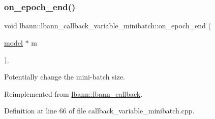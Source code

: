 \subsubsection{\texorpdfstring{on\+\_\+epoch\+\_\+end()}{on\_epoch\_end()}}
{\footnotesize\ttfamily void lbann\+::lbann\+\_\+callback\+\_\+variable\+\_\+minibatch\+::on\+\_\+epoch\+\_\+end (\begin{DoxyParamCaption}\item[{\hyperlink{classlbann_1_1model}{model} $\ast$}]{m }\end{DoxyParamCaption})\hspace{0.3cm}{\ttfamily [override]}, {\ttfamily [virtual]}}



Potentially change the mini-\/batch size. 



Reimplemented from \hyperlink{classlbann_1_1lbann__callback_a1fc71110e7f754bf73c9e0f344a448a5}{lbann\+::lbann\+\_\+callback}.



Definition at line 66 of file callback\+\_\+variable\+\_\+minibatch.\+cpp.


